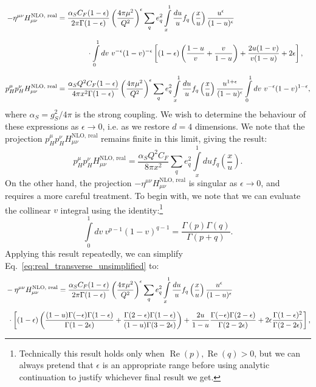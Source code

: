 \documentclass[withindex,glossary]{cam-thesis}
\renewcommand{\Re}{\operatorname{Re}} %
\begin{document}
\begin{align}
\label{eq:real_transverse_unsimplified}
-\eta^{\mu\nu} H_{\mu\nu}^{\text{NLO, real}} &= \frac{\alpha_S C_F  (1-\epsilon)}{2\pi \Gamma(1 - \epsilon)} \left( \frac{4\pi \mu^2}{Q^2} \right)^{\epsilon} \sum_{q} e_q^2 \int\limits_{x}^{1} \frac{du}{u} f_q\left( \frac{x}{u} \right) \frac{u^{\epsilon}}{(1-u)^{\epsilon}} \notag\\[1.5ex]
& \qquad\qquad \cdot \int\limits_{0}^{1} dv\ v^{-\epsilon} (1-v)^{-\epsilon}  \left[ (1-\epsilon) \left( \frac{1-u}{v} + \frac{v}{1-u}\right) + \frac{2u(1-v)}{v(1-u)} + 2\epsilon\right],\\[1.5ex]
p^{\mu}_H p^{\nu}_H H_{\mu\nu}^{\text{NLO, real}} &=\frac{\alpha_S Q^2 C_F (1-\epsilon)}{4\pi x^2 \Gamma(1 - \epsilon)} \left( \frac{4\pi \mu^2}{Q^2} \right)^{\epsilon} \sum_{q} e_q^2 \int\limits_{x}^{1} \frac{du}{u} f_q\left( \frac{x}{u} \right) \frac{u^{1 + \epsilon}}{(1-u)^{\epsilon}} \int\limits_{0}^{1} dv\ v^{-\epsilon} (1-v)^{1-\epsilon},
\end{align}
where $\alpha_S = g_S^2 / 4\pi$ is the strong coupling. We wish to determine the behaviour of these expressions as $\epsilon \rightarrow 0$, i.e. as we restore $d=4$ dimensions. We note that the projection $p^{\mu}_H p^{\nu}_HH_{\mu\nu}^{\text{NLO, real}}$ remains finite in this limit, giving the result:
\begin{equation}
p^{\mu}_H p^{\nu}_H H_{\mu\nu}^{\text{NLO, real}} =\frac{\alpha_S Q^2 C_F}{8\pi x^2} \sum_{q} e_q^2 \int\limits_{x}^{1} du f_q\left( \frac{x}{u} \right).
\end{equation}
On the other hand, the projection $-\eta^{\mu\nu} H_{\mu\nu}^{\text{NLO, real}}$ is singular as $\epsilon \rightarrow 0$, and requires a more careful treatment. To begin with, we note that we can evaluate the collinear $v$ integral using the identity:\footnote{Technically this result holds only when $\Re(p), \Re(q) > 0$, but we can always pretend that $\epsilon$ is an appropriate range before using analytic continuation to justify whichever final result we get.}
\begin{equation}
\int\limits_{0}^{1} dv\ v^{p-1} (1-v)^{q-1} = \frac{\Gamma(p)\Gamma(q)}{\Gamma(p+q)}.
\end{equation} 
Applying this result repeatedly, we can simplify Eq.~\eqref{eq:real_transverse_unsimplified} to:
\begin{align}
&-\eta^{\mu\nu} H_{\mu\nu}^{\text{NLO, real}} = \frac{\alpha_S C_F  (1-\epsilon)}{2\pi \Gamma(1 - \epsilon)} \left( \frac{4\pi \mu^2}{Q^2} \right)^{\epsilon} \sum_{q} e_q^2 \int\limits_{x}^{1} \frac{du}{u} f_q\left( \frac{x}{u} \right) \frac{u^{\epsilon}}{(1-u)^{\epsilon}} \notag\\[1.5ex]
& \ \cdot \left[ (1-\epsilon) \left(  \frac{(1-u)\Gamma(-\epsilon)\Gamma(1-\epsilon)}{\Gamma(1 - 2\epsilon)} +  \frac{\Gamma(2 - \epsilon) \Gamma(1-\epsilon)}{(1-u)\Gamma(3 - 2\epsilon)} \right) + \frac{2u}{1-u} \frac{\Gamma(-\epsilon)\Gamma(2-\epsilon)}{\Gamma(2 - 2\epsilon)} + 2\epsilon \frac{\Gamma(1-\epsilon)^2}{\Gamma(2-2\epsilon)} \right],
\end{align}
\end{document}
